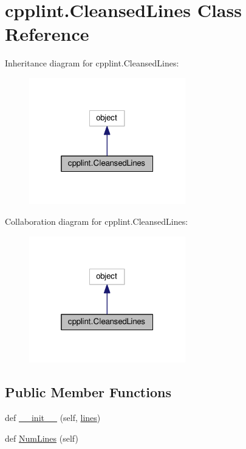 \hypertarget{classcpplint_1_1CleansedLines}{}\section{cpplint.\+Cleansed\+Lines Class Reference}
\label{classcpplint_1_1CleansedLines}


Inheritance diagram for cpplint.\+Cleansed\+Lines\+:\nopagebreak
\begin{figure}[H]
\begin{center}
\leavevmode
\includegraphics[width=193pt]{classcpplint_1_1CleansedLines__inherit__graph}
\end{center}
\end{figure}


Collaboration diagram for cpplint.\+Cleansed\+Lines\+:\nopagebreak
\begin{figure}[H]
\begin{center}
\leavevmode
\includegraphics[width=193pt]{classcpplint_1_1CleansedLines__coll__graph}
\end{center}
\end{figure}
\subsection*{Public Member Functions}
\begin{DoxyCompactItemize}
\item 
def \hyperlink{classcpplint_1_1CleansedLines_ad2bc06d9697e2bbfbc7e6b50878c8c8f}{\+\_\+\+\_\+init\+\_\+\+\_\+} (self, \hyperlink{classcpplint_1_1CleansedLines_a9cd74bd010da1610a46322d6821bd06a}{lines})
\item 
def \hyperlink{classcpplint_1_1CleansedLines_a26a7eff70493d64d58d16f4a406c7ee9}{Num\+Lines} (self)
\end{DoxyCompactItemize}

